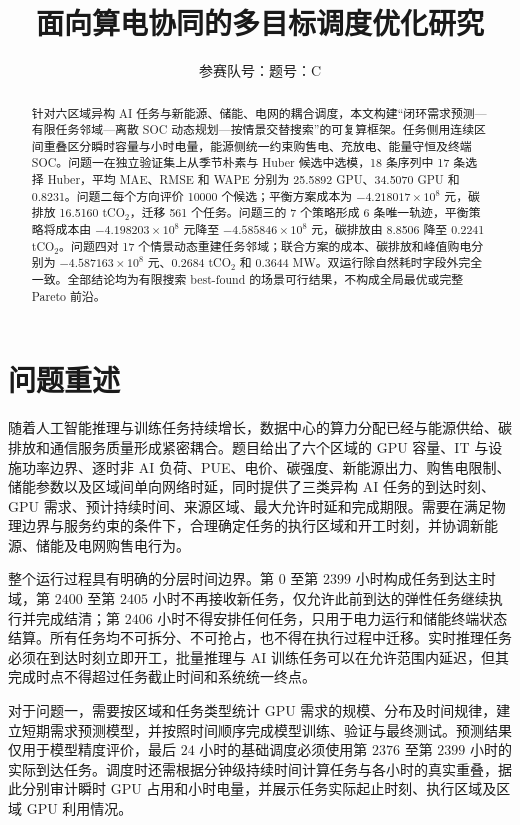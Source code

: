 \documentclass[withoutpreface,bwprint]{cumcmthesis}
\title{面向算电协同的多目标调度优化研究}
\author{参赛队号：\quad 题号：C}
\date{}
\begin{document}
\maketitle

\begin{abstract}
针对六区域异构 AI 任务与新能源、储能、电网的耦合调度，本文构建“闭环需求预测—有限任务邻域—离散 SOC 动态规划—按情景交替搜索”的可复算框架。任务侧用连续区间重叠区分瞬时容量与小时电量，能源侧统一约束购售电、充放电、能量守恒及终端 SOC。问题一在独立验证集上从季节朴素与 Huber 候选中选模，18 条序列中 17 条选择 Huber，平均 MAE、RMSE 和 WAPE 分别为 25.5892 GPU、34.5070 GPU 和 0.8231。问题二每个方向评价 10000 个候选；平衡方案成本为 $-4.218017\times10^8$ 元，碳排放 16.5160 tCO$_2$，迁移 561 个任务。问题三的 7 个策略形成 6 条唯一轨迹，平衡策略将成本由 $-4.198203\times10^8$ 元降至 $-4.585846\times10^8$ 元，碳排放由 8.8506 降至 0.2241 tCO$_2$。问题四对 17 个情景动态重建任务邻域；联合方案的成本、碳排放和峰值购电分别为 $-4.587163\times10^8$ 元、0.2684 tCO$_2$ 和 0.3644 MW。双运行除自然耗时字段外完全一致。全部结论均为有限搜索 best-found 的场景可行结果，不构成全局最优或完整 Pareto 前沿。
\end{abstract}

\clearpage

\section{问题重述}

随着人工智能推理与训练任务持续增长，数据中心的算力分配已经与能源供给、碳排放和通信服务质量形成紧密耦合。题目给出了六个区域的 GPU 容量、IT 与设施功率边界、逐时非 AI 负荷、PUE、电价、碳强度、新能源出力、购售电限制、储能参数以及区域间单向网络时延，同时提供了三类异构 AI 任务的到达时刻、GPU 需求、预计持续时间、来源区域、最大允许时延和完成期限。需要在满足物理边界与服务约束的条件下，合理确定任务的执行区域和开工时刻，并协调新能源、储能及电网购售电行为。

整个运行过程具有明确的分层时间边界。第 $0$ 至第 $2399$ 小时构成任务到达主时域，第 $2400$ 至第 $2405$ 小时不再接收新任务，仅允许此前到达的弹性任务继续执行并完成结清；第 $2406$ 小时不得安排任何任务，只用于电力运行和储能终端状态结算。所有任务均不可拆分、不可抢占，也不得在执行过程中迁移。实时推理任务必须在到达时刻立即开工，批量推理与 AI 训练任务可以在允许范围内延迟，但其完成时点不得超过任务截止时间和系统统一终点。

对于问题一，需要按区域和任务类型统计 GPU 需求的规模、分布及时间规律，建立短期需求预测模型，并按照时间顺序完成模型训练、验证与最终测试。预测结果仅用于模型精度评价，最后 $24$ 小时的基础调度必须使用第 $2376$ 至第 $2399$ 小时的实际到达任务。调度时还需根据分钟级持续时间计算任务与各小时的真实重叠，据此分别审计瞬时 GPU 占用和小时电量，并展示任务实际起止时刻、执行区域及区域 GPU 利用情况。
\end{document}
